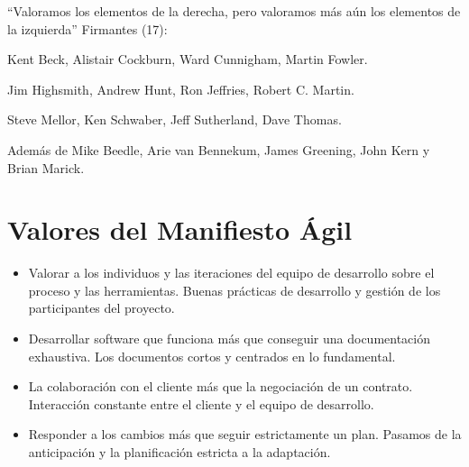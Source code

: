 \documentclass[12pt,twoside,titlepage]{report}
\begin{document}
{“Valoramos los elementos de la derecha, pero valoramos más aún los elementos de la izquierda”
Firmantes (17):

\begin{compactitem}
    \item Kent Beck, Alistair Cockburn, Ward Cunnigham, Martin Fowler.
    \item Jim Highsmith, Andrew Hunt, Ron Jeffries, Robert C. Martin.
    \item Steve Mellor, Ken Schwaber, Jeff Sutherland, Dave Thomas.
    \item Además de Mike Beedle, Arie van Bennekum, James Greening, John Kern y Brian Marick.
\end{compactitem}

\section{Valores del Manifiesto Ágil}
\begin{itemize}
    \item Valorar a los individuos y las iteraciones del equipo de desarrollo sobre el proceso y las herramientas. Buenas prácticas de desarrollo y gestión de los participantes del proyecto.
    \item Desarrollar software que funciona más que conseguir una documentación exhaustiva. Los documentos cortos y centrados en lo fundamental.
    \item La colaboración con el cliente más que la negociación de un contrato. Interacción constante entre el cliente y el equipo de desarrollo.
    \item Responder a los cambios más que seguir estrictamente un plan. Pasamos de la anticipación y la planificación estricta a la adaptación.
\end{itemize}

}
\end{document}
